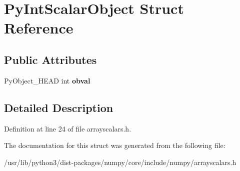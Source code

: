 \hypertarget{structPyIntScalarObject}{}\section{Py\+Int\+Scalar\+Object Struct Reference}
\label{structPyIntScalarObject}
\subsection*{Public Attributes}
\begin{DoxyCompactItemize}
\item 
Py\+Object\+\_\+\+H\+E\+AD int {\bfseries obval}\hypertarget{structPyIntScalarObject_af7a16e9e7e6e25e465c3233756b8fbac}{}\label{structPyIntScalarObject_af7a16e9e7e6e25e465c3233756b8fbac}

\end{DoxyCompactItemize}


\subsection{Detailed Description}


Definition at line 24 of file arrayscalars.\+h.



The documentation for this struct was generated from the following file\+:\begin{DoxyCompactItemize}
\item 
/usr/lib/python3/dist-\/packages/numpy/core/include/numpy/arrayscalars.\+h\end{DoxyCompactItemize}
